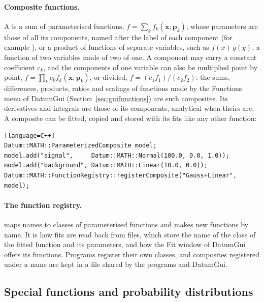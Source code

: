\paragraph{Composite functions.}
A  is a sum of parameterised functions, $f = \sum_k f_k(\mathbf{x};\mathbf{p}_k)$, whose
parameters are those of all its components, named after the label of each component (for example
), or a product of functions of separate variables, such as $f(x)\,g(y)$, a function of two
variables made of two of one. A component may carry a constant coefficient $c_k$, and the components of one
variable can also be multiplied point by point, $f = \prod_k c_k f_k(\mathbf{x};\mathbf{p}_k)$, or divided,
$f = (c_1 f_1)/(c_2 f_2)$: the sums, differences, products, ratios and scalings of functions made by the Functions
menu of DatumGui (Section~\ref{sec:guifunctions}) are such composites. Its derivatives and integrals are those of its
components, analytical when theirs are. A composite can be fitted, copied and stored with its fits like any other function:
\begin{widetext}
\begin{verbatim}[language=C++]
Datum::MATH::ParameterizedComposite model;
model.add("signal",     Datum::MATH::Normal(100.0, 0.0, 1.0));
model.add("background", Datum::MATH::Linear(10.0, 0.0));
Datum::MATH::FunctionRegistry::registerComposite("Gauss+Linear", model);
\end{verbatim}
\end{widetext}
\paragraph{The function registry.}
 maps names to classes of parameterised functions and makes new functions by name. It is how
fits are read back from files, which store the name of the class of the fitted function and its parameters, and
how the Fit window of DatumGui offers its functions. Programs register their own classes, and composites registered
under a name are kept in a file shared by the programs and DatumGui.

\subsection{Special functions and probability distributions}
\label{sec:distributions}


